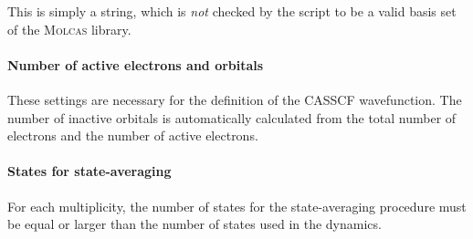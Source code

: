 \documentclass[a4paper,11pt,DIV=15,openany,twoside=false]{scrbook}
\begin{document}
This is simply a string, which is \textit{not} checked by the script to be a valid basis set of the \textsc{Molcas} library.

\paragraph{Number of active electrons and orbitals}

These settings are necessary for the definition of the CASSCF wavefunction. The number of inactive orbitals is automatically calculated from the total number of electrons and the number of active electrons.

\paragraph{States for state-averaging}

For each multiplicity, the number of states for the state-averaging procedure must be equal or larger than the number of states used in the dynamics.
\end{document}
